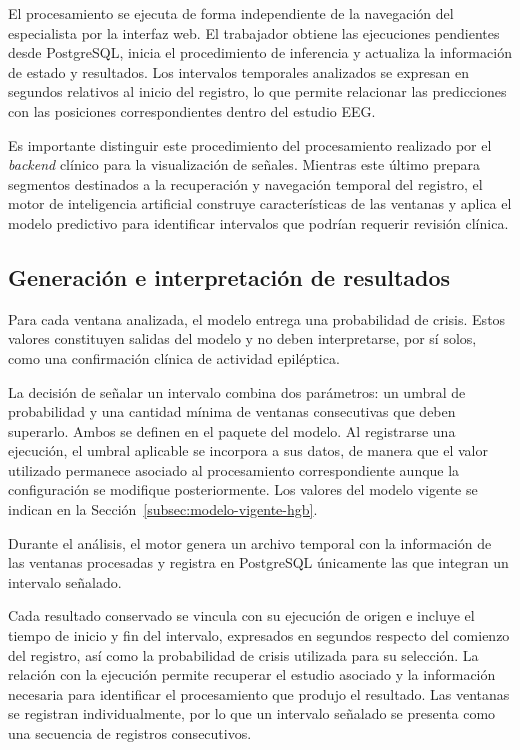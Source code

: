 El procesamiento se ejecuta de forma independiente de la navegación del especialista por la interfaz web. El trabajador obtiene las ejecuciones pendientes desde PostgreSQL, inicia el procedimiento de inferencia y actualiza la información de estado y resultados. Los intervalos temporales analizados se expresan en segundos relativos al inicio del registro, lo que permite relacionar las predicciones con las posiciones correspondientes dentro del estudio EEG.

Es importante distinguir este procedimiento del procesamiento realizado por el \textit{backend} clínico para la visualización de señales. Mientras este último prepara segmentos destinados a la recuperación y navegación temporal del registro, el motor de inteligencia artificial construye características de las ventanas y aplica el modelo predictivo para identificar intervalos que podrían requerir revisión clínica.


\subsection{Generación e interpretación de resultados}
\label{subsec:generacion-interpretacion-resultados-ia}

Para cada ventana analizada, el modelo entrega una probabilidad de crisis.
Estos valores constituyen salidas del modelo y no deben interpretarse, por sí solos, como una confirmación clínica de actividad epiléptica.

La decisión de señalar un intervalo combina dos parámetros: un umbral de probabilidad y una cantidad mínima de ventanas consecutivas que deben superarlo.
Ambos se definen en el paquete del modelo.
Al registrarse una ejecución, el umbral aplicable se incorpora a sus datos, de manera que el valor utilizado permanece asociado al procesamiento correspondiente aunque la configuración se modifique posteriormente.
Los valores del modelo vigente se indican en la Sección~\ref{subsec:modelo-vigente-hgb}.

Durante el análisis, el motor genera un archivo temporal con la información de las ventanas procesadas y registra en PostgreSQL únicamente las que integran un intervalo señalado.

Cada resultado conservado se vincula con su ejecución de origen e incluye el tiempo de inicio y fin del intervalo, expresados en segundos respecto del comienzo del registro, así como la probabilidad de crisis utilizada para su selección. La relación con la ejecución permite recuperar el estudio asociado y la información necesaria para identificar el procesamiento que produjo el resultado. Las ventanas se registran individualmente, por lo que un intervalo señalado se presenta como una secuencia de registros consecutivos.

